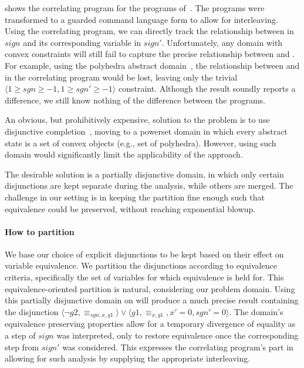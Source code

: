  shows the correlating program for the programs of~. The programs were transformed to a guarded command language form to allow for interleaving. Using the correlating program, we can directly track the relationship between  in $sign$ and its corresponding variable  in $sign'$. Unfortunately, any domain with convex constraints will still fail to capture the precise relationship between  and . For example, using the polyhedra abstract domain~\cite{TODO}, the relationship between  and  in the correlating program would be lost, leaving only the trivial $\langle 1 \geq sgn \geq -1, 1 \geq sgn' \geq -1 \rangle$ constraint. Although the result soundly reports a difference, we still know nothing of the difference between the programs.

An obvious, but prohibitively expensive, solution to the problem is to use disjunctive completion~\cite{TODO}, moving to a powerset domain in which every abstract state is a set of convex objects (e.g., set of polyhedra). However, using such domain would significantly limit the applicability of the approach.

The desirable solution is a partially disjunctive domain, in which only certain disjunctions are kept separate during the analysis, while others are merged. The challenge in our setting is in keeping the partition fine enough such that equivalence could be preserved, without reaching exponential blowup.

\paragraph{How to partition}
We base our choice of explicit disjunctions to be kept based on their effect on variable equivalence. We partition the disjunctions according to equivalence criteria, specifically the set of variables for which equivalence is held for. This equivalence-oriented partition is natural, considering our problem domain. Using this partially disjunctive domain on  will produce a much precise result containing the disjunction $\langle \neg g2, \equiv_{sgn,x,g1} \rangle \vee \langle g1, \equiv_{x,g1}, x' = 0, sgn' = 0 \rangle$. The domain's equivalence preserving properties allow for a temporary divergence of equality as a step of $sign$ was interpreted, only to restore equivalence once the corresponding step from $sign'$ was considered. This expresses the correlating program's part in allowing for such analysis by supplying the appropriate interleaving.

